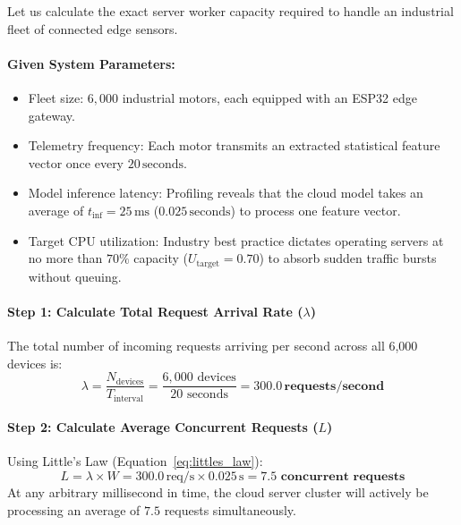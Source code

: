 \begin{example}
Let us calculate the exact server worker capacity required to handle an industrial fleet of connected edge sensors.

\paragraph{Given System Parameters:}
\begin{itemize}
    \item Fleet size: $6{,}000$ industrial motors, each equipped with an ESP32 edge gateway.
    \item Telemetry frequency: Each motor transmits an extracted statistical feature vector once every $20\,\text{seconds}$.
    \item Model inference latency: Profiling reveals that the cloud model takes an average of $t_{\text{inf}} = 25\,\text{ms}$ ($0.025\,\text{seconds}$) to process one feature vector.
    \item Target CPU utilization: Industry best practice dictates operating servers at no more than $70\%$ capacity ($U_{\text{target}} = 0.70$) to absorb sudden traffic bursts without queuing.
\end{itemize}

\paragraph{Step 1: Calculate Total Request Arrival Rate ($\lambda$)}
The total number of incoming requests arriving per second across all 6,000 devices is:
\begin{equation*}
\lambda = \frac{N_{\text{devices}}}{T_{\text{interval}}} = \frac{6{,}000 \text{ devices}}{20 \text{ seconds}} = \mathbf{300.0\,\text{requests/second}}
\end{equation*}

\paragraph{Step 2: Calculate Average Concurrent Requests ($L$)}
Using Little's Law (Equation~\eqref{eq:littles_law}):
\begin{equation*}
L = \lambda \times W = 300.0\,\text{req/s} \times 0.025\,\text{s} = \mathbf{7.5 \text{ concurrent requests}}
\end{equation*}
At any arbitrary millisecond in time, the cloud server cluster will actively be processing an average of $7.5$ requests simultaneously.


\end{example}
